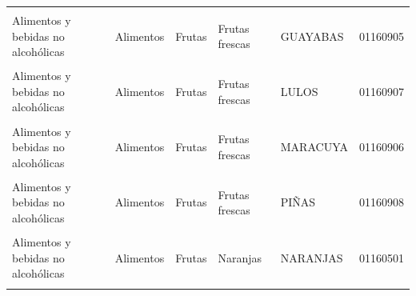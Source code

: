 \begin{longtable}[t]{lllllc}
\hspace{1em}\cellcolor{gray!10}{Alimentos y bebidas no alcohólicas} & \cellcolor{gray!10}{Alimentos} & \cellcolor{gray!10}{Frutas} & \cellcolor{gray!10}{Frutas frescas} & \cellcolor{gray!10}{AGUACATE} & \cellcolor{gray!10}{01160912}\\
\hspace{1em}Alimentos y bebidas no alcohólicas & Alimentos & Frutas & Frutas frescas & GUAYABAS & 01160905\\
\hspace{1em}\cellcolor{gray!10}{Alimentos y bebidas no alcohólicas} & \cellcolor{gray!10}{Alimentos} & \cellcolor{gray!10}{Frutas} & \cellcolor{gray!10}{Frutas frescas} & \cellcolor{gray!10}{LIMONES} & \cellcolor{gray!10}{01160901}\\
\hspace{1em}Alimentos y bebidas no alcohólicas & Alimentos & Frutas & Frutas frescas & LULOS & 01160907\\
\hspace{1em}\cellcolor{gray!10}{Alimentos y bebidas no alcohólicas} & \cellcolor{gray!10}{Alimentos} & \cellcolor{gray!10}{Frutas} & \cellcolor{gray!10}{Frutas frescas} & \cellcolor{gray!10}{MANZANAS} & \cellcolor{gray!10}{01160903}\\
\hspace{1em}Alimentos y bebidas no alcohólicas & Alimentos & Frutas & Frutas frescas & MARACUYA & 01160906\\
\hspace{1em}\cellcolor{gray!10}{Alimentos y bebidas no alcohólicas} & \cellcolor{gray!10}{Alimentos} & \cellcolor{gray!10}{Frutas} & \cellcolor{gray!10}{Frutas frescas} & \cellcolor{gray!10}{PAPAYAS} & \cellcolor{gray!10}{01160909}\\
\hspace{1em}Alimentos y bebidas no alcohólicas & Alimentos & Frutas & Frutas frescas & PIÑAS & 01160908\\
\hspace{1em}\cellcolor{gray!10}{Alimentos y bebidas no alcohólicas} & \cellcolor{gray!10}{Alimentos} & \cellcolor{gray!10}{Frutas} & \cellcolor{gray!10}{Moras} & \cellcolor{gray!10}{MORAS} & \cellcolor{gray!10}{01160801}\\
\hspace{1em}Alimentos y bebidas no alcohólicas & Alimentos & Frutas & Naranjas & NARANJAS & 01160501\\
\hspace{1em}\cellcolor{gray!10}{Alimentos y bebidas no alcohólicas} & \cellcolor{gray!10}{Alimentos} & \cellcolor{gray!10}{Frutas} & \cellcolor{gray!10}{Tomate de árbol} & \cellcolor{gray!10}{TOMATE DE ÁRBOL} & \cellcolor{gray!10}{01160701}\\

\end{longtable}
